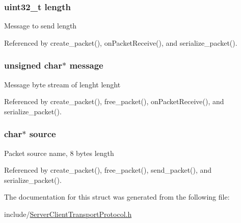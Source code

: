 \subsubsection[{\texorpdfstring{length}{length}}]{\setlength{\rightskip}{0pt plus 5cm}uint32\+\_\+t length}\hypertarget{structpacket__transport__t_aebb70c2aab3407a9f05334c47131a43b}{}\label{structpacket__transport__t_aebb70c2aab3407a9f05334c47131a43b}
Message to send length 

Referenced by create\+\_\+packet(), on\+Packet\+Receive(), and serialize\+\_\+packet().

\subsubsection[{\texorpdfstring{message}{message}}]{\setlength{\rightskip}{0pt plus 5cm}unsigned char$\ast$ message}\hypertarget{structpacket__transport__t_abb13456032cf48eaa794391b6ed937c7}{}\label{structpacket__transport__t_abb13456032cf48eaa794391b6ed937c7}
Message byte stream of lenght lenght 

Referenced by create\+\_\+packet(), free\+\_\+packet(), on\+Packet\+Receive(), and serialize\+\_\+packet().

\subsubsection[{\texorpdfstring{source}{source}}]{\setlength{\rightskip}{0pt plus 5cm}char$\ast$ source}\hypertarget{structpacket__transport__t_aee6937c81d468a0915308234d09d212c}{}\label{structpacket__transport__t_aee6937c81d468a0915308234d09d212c}
Packet source name, 8 bytes length 

Referenced by create\+\_\+packet(), free\+\_\+packet(), send\+\_\+packet(), and serialize\+\_\+packet().



The documentation for this struct was generated from the following file\+:\begin{DoxyCompactItemize}
\item 
include/\hyperlink{_server_client_transport_protocol_8h}{Server\+Client\+Transport\+Protocol.\+h}\end{DoxyCompactItemize}
